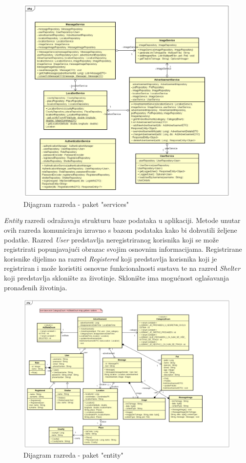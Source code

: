 			\begin{figure}[htb]
				\centering
				\includegraphics[width=\textwidth]{slike/serviceUML.png}
				\caption{Dijagram razreda - paket "services"}
			\end{figure}
			\pagebreak

                \textit{Entity} razredi odražavaju strukturu baze podataka u aplikaciji. Metode unutar ovih razreda komuniciraju izravno s bazom podataka kako bi dohvatili željene podatke. Razred \textit{User} predstavlja neregistriranog korisnika koji se može registrirati popunjavajući obrazac svojim osnovnim informacijama. Registrirane korisnike dijelimo na razred \textit{Registered} koji predstavlja korisnika koji je registriran i može koristiti osnovne funkcionalnosti sustava te na razred \textit{Shelter} koji predstavlja sklonište za životinje. Sklonište ima mogućnost oglašavanja pronađenih životinja.
   
			\begin{figure}[htb]
				\centering
				\includegraphics[width=\textwidth]{slike/entitiesUML.png}
				\caption{Dijagram razreda - paket "entity"}
			\end{figure}
			\pagebreak
			
